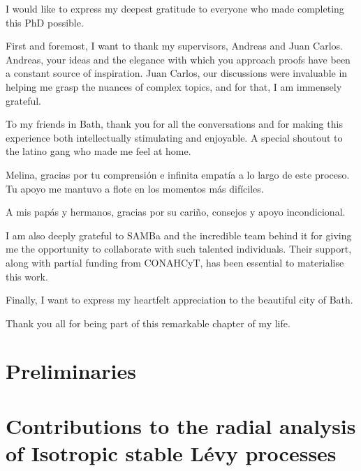 \documentclass[11pt, twoside]{report}
\begin{document}
\begin{acknowledgements}
I would like to express my deepest gratitude to everyone who made completing this PhD possible.  

First and foremost, I want to thank my supervisors, Andreas and Juan Carlos. Andreas, your ideas and the elegance with which you approach proofs have been a constant source of inspiration. Juan Carlos, our discussions were invaluable in helping me grasp the nuances of complex topics, and for that, I am immensely grateful.  

To my friends in Bath, thank you for all the conversations and for making this experience both intellectually stimulating and enjoyable. A special shoutout to the latino gang who made me feel at home.  

Melina, gracias por tu comprensión e infinita empatía a lo largo de este proceso. Tu apoyo me mantuvo a flote en los momentos más difíciles. 

A mis papás y hermanos, gracias por su cariño, consejos y apoyo incondicional.  

I am also deeply grateful to SAMBa and the incredible team behind it for giving me the opportunity to collaborate with such talented individuals. Their support, along with partial funding from CONAHCyT, has been essential to materialise this work.  

Finally, I want to express my heartfelt appreciation to the beautiful city of Bath.  

Thank you all for being part of this remarkable chapter of my life.
\end{acknowledgements}




\tableofcontents
\newpage
\chapter*{Preliminaries}


\chapter{Contributions to the radial analysis of Isotropic stable Lévy processes} 
\label{chapter:deep3brownian}

\end{document}
